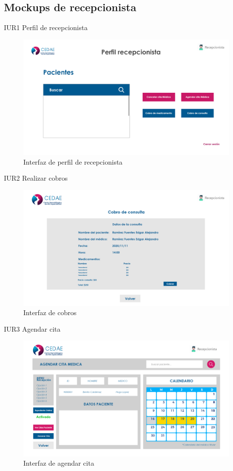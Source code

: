 \documentclass[12pt,letterpaper]{article}
\begin{document}
        \subsection{Mockups de recepcionista}
        IUR1 Perfil de recepcionista
            \begin{figure}[H]
                \centering
                \includegraphics [scale=0.19]{interfaces/rec_perfil}
                \caption{Interfaz de perfil de recepcionista}
            \end{figure}
        IUR2 Realizar cobros
            \begin{figure}[H]
                \centering
                \includegraphics [scale=0.19]{interfaces/rec_cobro}
                \caption{Interfaz de cobros}
            \end{figure}
        IUR3 Agendar cita
            \begin{figure}[H]
                \centering
                \includegraphics [scale=0.18]{interfaces/rec_agendar_cita}
                \caption{Interfaz de agendar cita}
            \end{figure}
\end{document}
